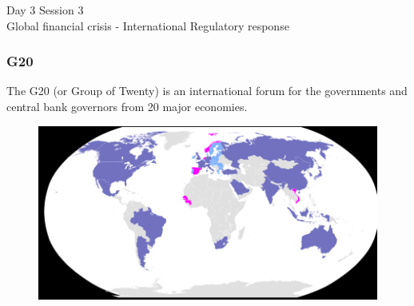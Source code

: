 \documentclass[11pt]{beamer}
\begin{document}
\begin{frame}
\begin{center}
 Day 3 Session 3 \\
Global financial crisis - International Regulatory response
\end{center}
\end{frame}





\begin{frame}
\frametitle{G20}
The G20 (or Group of Twenty) is an international forum for the governments and central bank governors from 20 major economies.
\begin{figure}
\includegraphics[width=1\textwidth]{G20.png}
\end{figure}
\end{frame}
\end{document}
